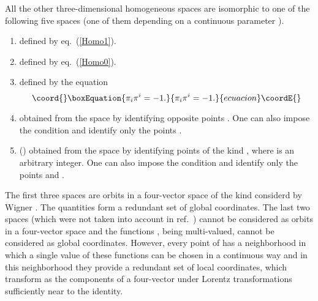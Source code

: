 \documentclass[a4paper,12pt]{article}
\begin{document}
All the other three-dimensional homogeneous spaces are isomorphic to one of the following five spaces (one of them depending on a continuous parameter \coordHE{}).
\renewcommand{\labelenumi}{\alph{enumi})}
\begin{enumerate}
\item {}\coordHE{} defined by eq.\ (\ref{Homo1}).
\item {}\coordHE{} defined by eq.\ (\ref{Homo0}).
\item {}\coordHE{} defined by the equation
\begin{equation}\coord{}\boxEquation{  \label{Homo2}
\pi_i \pi^i = -1.
}{  \pi_i \pi^i = -1.
}{ecuacion}\coordE{}\end{equation} 
\item {}\coordHE{} obtained from the space \coordHE{} by identifying opposite points \coordHE{}. One can also impose the condition \coordHE{} and identify only  the points \coordHE{}.
\item {}\coordHE{} (\coordHE{}) obtained from the space \coordHE{} by identifying points of the kind \coordHE{}, where \coordHE{} is an arbitrary integer.  One can also impose the condition \coordHE{} and identify only the points \coordHE{} and \coordHE{}.
\end{enumerate}

The first three spaces are orbits in a four-vector space of the kind considerd by Wigner \cite {Wigner}. The quantities \coordHE{} form a redundant set of global coordinates.  The last two spaces (which were not taken into account in ref.\ \cite{Toller}) cannot be considered as orbits in a four-vector space and the functions \coordHE{}, being multi-valued, cannot be considered as global coordinates. However, every point of \myHighlight{$\Pi$}\coordHE{} has a neighborhood in which a single value of these functions can be chosen in a continuous way and in this neighborhood they provide a redundant set of local coordinates, which transform as the components of a four-vector under Lorentz transformations sufficiently near to the identity.
\end{document}
